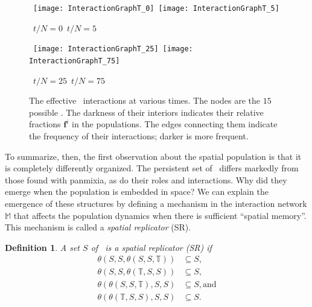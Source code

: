 \documentclass[pre,twocolumn,showpacs,superscriptaddress,preprintnumbers,floatfix]{revtex4}
\theoremstyle{plain}    \newtheorem{Lem}{Lemma}
\theoremstyle{plain}    \newtheorem*{ProLem}{Proof}
\theoremstyle{plain}    \newtheorem{Cor}{Corollary}
\theoremstyle{plain}    \newtheorem*{ProCor}{Proof}
\theoremstyle{plain}    \newtheorem{The}{Theorem}
\theoremstyle{plain}    \newtheorem*{ProThe}{Proof}
\theoremstyle{plain}    \newtheorem{Prop}{Proposition}
\theoremstyle{plain}    \newtheorem*{ProProp}{Proof}
\theoremstyle{plain}    \newtheorem*{Conj}{Conjecture}
\theoremstyle{plain}    \newtheorem*{Rem}{Remark}
\theoremstyle{plain}    \newtheorem{Def}{Definition}
\theoremstyle{plain}    \newtheorem*{Not}{Notation}
\newcommand{\T}{\mathbb{T}}
\newcommand{\M}{\mathbb{M}}
\newcommand{\PrEMType}{\mathbf{f}}
\begin{document}
\begin{figure*}[hbtp]
  \vspace{9pt}
  \centerline{\hbox{ \hspace{0.0in}
	\texttt{[image: InteractionGraphT\_0]}
    \hspace{10pt}
	\texttt{[image: InteractionGraphT\_5]}
    }
  }
  \vspace{3pt}
  \hbox{\hspace{2.2in} $t/N = 0$ \hspace{1.8in} $t/N = 5$}
  \vspace{15pt}
  \centerline{\hbox{ \hspace{0.0in}
	\texttt{[image: InteractionGraphT\_25]}
    \hspace{10pt}
	\texttt{[image: InteractionGraphT\_75]}
    }
  }
  \vspace{3pt}
  \hbox{\hspace{2.1in} $t/N = 25$ \hspace{1.8in} $t/N = 75$}
  \vspace{7pt}
\caption{The effective \eM\ interactions at various times.
  The nodes are the $15$ possible \eMs. The darkness of their
  interiors indicates their relative fractions $\PrEMType^i$ in the
  populations. The edges connecting them indicate the frequency of
  their interactions; darker is more frequent.
  }
\label{fig:InteractionVTime}
\end{figure*}

To summarize, then, the first observation about the spatial population is that
it is completely differently organized. The persistent set of \eMs\ differs
markedly from those found with panmixia, as do their roles and interactions.
Why did they emerge when the population is embedded in space? We can explain
the emergence of these structures by defining a mechanism in the interaction
network $\M$ that affects the population dynamics when there is sufficient
``spatial memory''. This mechanism is called a \emph{spatial replicator} (SR).

\begin{Def}
A set $S$ of \eMs\ is a \emph{spatial replicator} (SR) if 
\begin{align*}
\theta(S,S,\theta(S,S,\T)) & \subseteq S,\\
\theta(S,S,\theta(\T,S,S)) & \subseteq S,\\
\theta(\theta(S,S,\T),S,S) & \subseteq S, \mathrm{ and} \\
\theta(\theta(\T,S,S),S,S) & \subseteq S.
\end{align*}
\end{Def}
\end{document}
